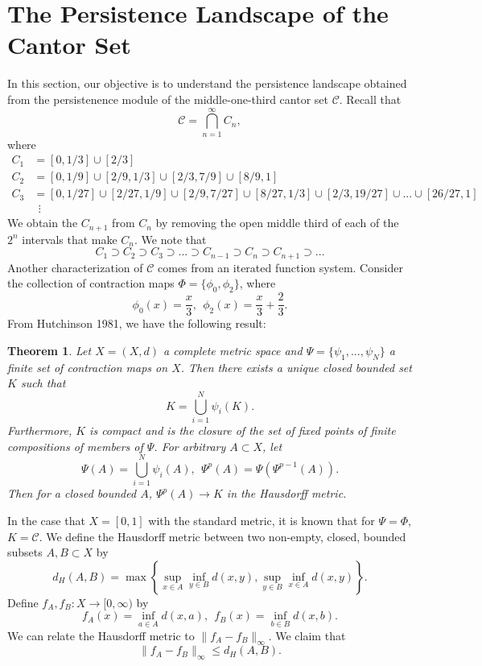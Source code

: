 \documentclass [52pt] {article}
\newtheorem{theorem}{Theorem}
\begin{document}
\section{The Persistence Landscape of the Cantor Set}
In this section, our objective is to understand the persistence landscape obtained from the persistenence module of the middle-one-third cantor set $\mathcal{C}$.  Recall that 
\[\mathcal{C} = \bigcap_{n=1}^\infty C_n,\]
where 
\[\begin{split}
C_1 &= [0,1/3]\cup [2/3]\\
C_2 &= [0,1/9]\cup[2/9,1/3]\cup [2/3,7/9]\cup[8/9,1]\\
C_3 & = [0,1/27]\cup[2/27,1/9]\cup[2/9,7/27]\cup[8/27,1/3]\cup[2/3,19/27]\cup ...\cup [26/27,1]\\
&\:\:\vdots
\end{split}\]
We obtain the $C_{n+1}$ from $C_n$ by removing the open middle third of each of the $2^n$ intervals that make $C_n$.  We note that 
\[C_1 \supset C_2 \supset C_3\supset ...\supset C_{n-1}\supset C_n \supset C_{n+1}\supset ...\]
Another characterization of $\mathcal{C}$ comes from an iterated function system.  Consider the collection of contraction maps $\Phi = \{\phi_0,\phi_2\}$, where
\[\phi_0(x) = \frac{x}{3},\:\:\phi_2(x) = \frac{x}{3}+\frac{2}{3}.\]
From Hutchinson 1981, we have the following result:
\begin{theorem}\label{thm : Hutch1981}
Let $X = (X,d)$ a complete metric space and $\Psi = \{\psi_1,...,\psi_N\}$ a finite set of contraction maps on $X$.  Then there exists a unique closed bounded set $K$ such that
\[K = \bigcup_{i=1}^N \psi_i(K).\]
Furthermore, $K$ is compact and is the closure of the set of fixed points of finite compositions of members of $\Psi$.  For arbitrary $A\subset X$, let 
\[\Psi(A) = \bigcup_{i=1}^N \psi_i(A),\:\: \Psi^p(A) = \Psi(\Psi^{p-1}(A)).\]
Then for a closed bounded $A$, $\Psi^p(A)\to K$ in the Hausdorff metric.
\end{theorem}
In the case that $X= [0,1]$ with the standard metric, it is known that for $\Psi = \Phi$, $K = \mathcal{C}$.  We define the Hausdorff metric between two non-empty, closed, bounded subsets $A,B\subset X$ by
\[d_H(A,B) = \max\left\{\sup_{x\in A}\inf_{y\in B}d(x,y),\sup_{y\in B}\inf_{x\in A}d(x,y)\right\}.\]
Define $f_A,f_B:X\to[0,\infty)$ by
\[f_A(x) = \inf_{a\in A}d(x,a),\:\:f_B(x) = \inf_{b\in B}d(x,b).\]
We can relate the Hausdorff metric to $\|f_A - f_B\|_\infty$.  We claim that
\begin{equation}
\|f_A -f_B\|_\infty \le d_H(A,B).
\end{equation}
\end{document}
